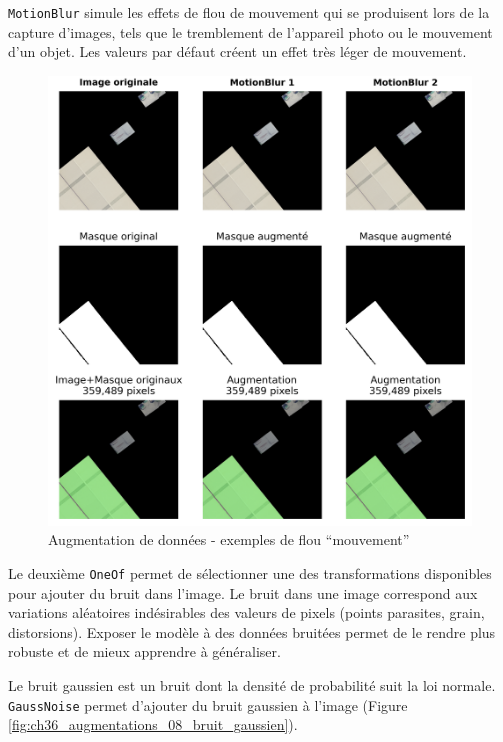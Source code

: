 \newpage
\texttt{MotionBlur} simule les effets de flou de mouvement qui se produisent lors de la capture d'images, tels que le tremblement de l'appareil photo ou le mouvement d'un objet. Les valeurs par défaut créent un effet très léger de mouvement.
\begin{figure}[H]
    \centering
    \includegraphics[width=1\linewidth]{02-main/figures/ch3/ch36_augmentations_07_flou_motion.png}
    \caption{Augmentation de données - exemples de flou ``mouvement''}
    \label{fig:ch36_augmentations_07_flou_motion}
\end{figure}

\newpage
Le deuxième \texttt{OneOf} permet de sélectionner une des transformations disponibles pour ajouter du bruit dans l'image. Le bruit dans une image correspond aux variations aléatoires indésirables des valeurs de pixels (points parasites, grain, distorsions). Exposer le modèle à des données bruitées permet de le rendre plus robuste et de mieux apprendre à généraliser.

Le bruit gaussien est un bruit dont la densité de probabilité suit la loi normale. \texttt{GaussNoise} permet d'ajouter du bruit gaussien à l'image (Figure \ref{fig:ch36_augmentations_08_bruit_gaussien}).

